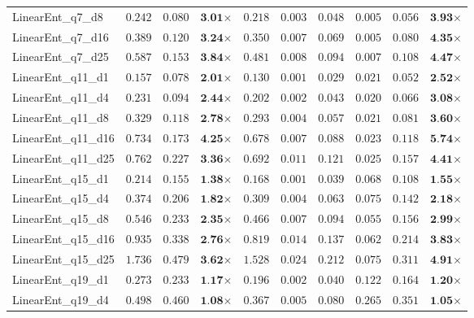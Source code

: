 \begin{table*}[t]
{\begin{tabular}{| l || r r c || r r r r r c |}
LinearEnt\_q7\_d8 & $0.242$ & $0.080$ & $\textbf{3.01}$$\times$ & $0.218$ & $0.003$ & $0.048$ & $0.005$ & $0.056$ & $\textbf{3.93}$$\times$ \\
LinearEnt\_q7\_d16 & $0.389$ & $0.120$ & $\textbf{3.24}$$\times$ & $0.350$ & $0.007$ & $0.069$ & $0.005$ & $0.080$ & $\textbf{4.35}$$\times$ \\
LinearEnt\_q7\_d25 & $0.587$ & $0.153$ & $\textbf{3.84}$$\times$ & $0.481$ & $0.008$ & $0.094$ & $0.007$ & $0.108$ & $\textbf{4.47}$$\times$ \\
LinearEnt\_q11\_d1 & $0.157$ & $0.078$ & $\textbf{2.01}$$\times$ & $0.130$ & $0.001$ & $0.029$ & $0.021$ & $0.052$ & $\textbf{2.52}$$\times$ \\
LinearEnt\_q11\_d4 & $0.231$ & $0.094$ & $\textbf{2.44}$$\times$ & $0.202$ & $0.002$ & $0.043$ & $0.020$ & $0.066$ & $\textbf{3.08}$$\times$ \\
LinearEnt\_q11\_d8 & $0.329$ & $0.118$ & $\textbf{2.78}$$\times$ & $0.293$ & $0.004$ & $0.057$ & $0.021$ & $0.081$ & $\textbf{3.60}$$\times$ \\
LinearEnt\_q11\_d16 & $0.734$ & $0.173$ & $\textbf{4.25}$$\times$ & $0.678$ & $0.007$ & $0.088$ & $0.023$ & $0.118$ & $\textbf{5.74}$$\times$ \\
LinearEnt\_q11\_d25 & $0.762$ & $0.227$ & $\textbf{3.36}$$\times$ & $0.692$ & $0.011$ & $0.121$ & $0.025$ & $0.157$ & $\textbf{4.41}$$\times$ \\
LinearEnt\_q15\_d1 & $0.214$ & $0.155$ & $\textbf{1.38}$$\times$ & $0.168$ & $0.001$ & $0.039$ & $0.068$ & $0.108$ & $\textbf{1.55}$$\times$ \\
LinearEnt\_q15\_d4 & $0.374$ & $0.206$ & $\textbf{1.82}$$\times$ & $0.309$ & $0.004$ & $0.063$ & $0.075$ & $0.142$ & $\textbf{2.18}$$\times$ \\
LinearEnt\_q15\_d8 & $0.546$ & $0.233$ & $\textbf{2.35}$$\times$ & $0.466$ & $0.007$ & $0.094$ & $0.055$ & $0.156$ & $\textbf{2.99}$$\times$ \\
LinearEnt\_q15\_d16 & $0.935$ & $0.338$ & $\textbf{2.76}$$\times$ & $0.819$ & $0.014$ & $0.137$ & $0.062$ & $0.214$ & $\textbf{3.83}$$\times$ \\
LinearEnt\_q15\_d25 & $1.736$ & $0.479$ & $\textbf{3.62}$$\times$ & $1.528$ & $0.024$ & $0.212$ & $0.075$ & $0.311$ & $\textbf{4.91}$$\times$ \\
LinearEnt\_q19\_d1 & $0.273$ & $0.233$ & $\textbf{1.17}$$\times$ & $0.196$ & $0.002$ & $0.040$ & $0.122$ & $0.164$ & $\textbf{1.20}$$\times$ \\
LinearEnt\_q19\_d4 & $0.498$ & $0.460$ & $\textbf{1.08}$$\times$ & $0.367$ & $0.005$ & $0.080$ & $0.265$ & $0.351$ & $\textbf{1.05}$$\times$ \\

\end{tabular}}
\end{table*}
